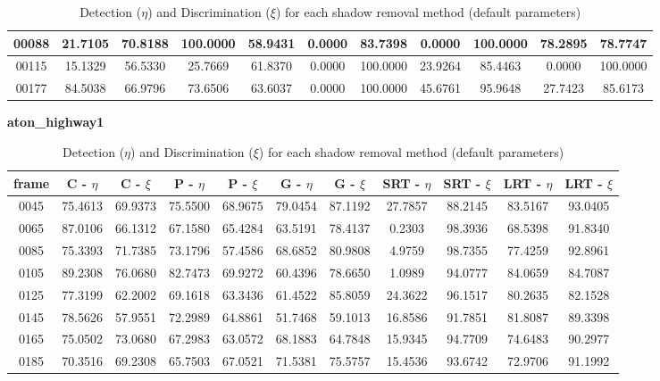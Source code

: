 \begin{appendices}
\begin{table}
\begin{tabular}{ |c|c|c|c|c|c|c|c|c|c|c| }
\hline
00088 &  21.7105 &  70.8188 &   100.0000 &  58.9431 &   0.0000 &  83.7398 &   0.0000 &  100.0000 &   78.2895 &  78.7747 \\
\hline
00115 &  15.1329 &  56.5330 &   25.7669 &  61.8370 &   0.0000 &  100.0000 &   23.9264 &  85.4463 &   0.0000 &  100.0000 \\
\hline
00177 &  84.5038 &  66.9796 &   73.6506 &  63.6037 &   0.0000 &  100.0000 &   45.6761 &  95.9648 &   27.7423 &  85.6173 \\
\hline
\end{tabular}
\caption*{Detection ($\eta$) and Discrimination ($\xi$) for each shadow removal method (default parameters)}
\end{table}

\begin{table}
\centering
\caption{\textbf{aton\_highway1}}
\begin{tabular}{ |c|c|c|c|c|c|c|c|c|c|c| }
	\hline
\textbf{frame} &  \textbf{C - $\eta$} &  \textbf{C - $\xi$} &  \textbf{P - $\eta$} &  \textbf{P - $\xi$} &  \textbf{G - $\eta$} &  \textbf{G - $\xi$} &  \textbf{SRT - $\eta$} &  \textbf{SRT - $\xi$} &  \textbf{LRT - $\eta$} &  \textbf{LRT - $\xi$} \\
\hline
\hline
0045 &  75.4613 &  69.9373 &   75.5500 &  68.9675 &   79.0454 &  87.1192 &   27.7857 &  88.2145 &   83.5167 &  93.0405    \\
\hline
0065 &  87.0106 &  66.1312 &   67.1580 &  65.4284 &   63.5191 &  78.4137 &   0.2303 &  98.3936 &   68.5398 &  91.8340    \\
\hline
0085 &  75.3393 &  71.7385 &   73.1796 &  57.4586 &   68.6852 &  80.9808 &   4.9759 &  98.7355 &   77.4259 &  92.8961    \\
\hline
0105 &  89.2308 &  76.0680 &   82.7473 &  69.9272 &   60.4396 &  78.6650 &   1.0989 &  94.0777 &   84.0659 &  84.7087    \\
\hline
0125 &  77.3199 &  62.2002 &   69.1618 &  63.3436 &   61.4522 &  85.8059 &   24.3622 &  96.1517 &   80.2635 &  82.1528    \\
\hline
0145 &  78.5626 &  57.9551 &   72.2989 &  64.8861 &   51.7468 &  59.1013 &   16.8586 &  91.7851 &   81.8087 &  89.3398    \\
\hline
0165 &  75.0502 &  73.0680 &   67.2983 &  63.0572 &   68.1883 &  64.7848 &   15.9345 &  94.7709 &   74.6483 &  90.2977    \\
\hline
0185 &  70.3516 &  69.2308 &   65.7503 &  67.0521 &   71.5381 &  75.5757 &   15.4536 &  93.6742 &   72.9706 &  91.1992    \\
\hline
\end{tabular}
\caption*{Detection ($\eta$) and Discrimination ($\xi$) for each shadow removal method (default parameters)}
\end{table}


\end{appendices}
